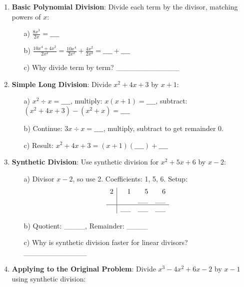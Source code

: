 \documentclass[12pt]{article}
\begin{document}
\begin{enumerate}[label=9.\arabic*]
    \item \textbf{Basic Polynomial Division}: Divide each term by the divisor, matching powers of \( x \):
    \begin{enumerate}
        \item[a)] \( \frac{8x^3}{2x} = \_\_\_\_ \)
        \item[b)] \( \frac{10x^4 + 4x^2}{2x^2} = \frac{10x^4}{2x^2} + \frac{4x^2}{2x^2} = \_\_\_\_ + \_\_\_\_ \)
        \item[c)] Why divide term by term? \_\_\_\_\_\_\_\_\_\_\_\_
    \end{enumerate}
    \item \textbf{Simple Long Division}: Divide \( x^2 + 4x + 3 \) by \( x + 1 \):
    \begin{enumerate}
        \item[a)] \( x^2 \div x = \_\_\_\_ \), multiply: \( x(x + 1) = \_\_\_\_ \), subtract: \( (x^2 + 4x + 3) - (x^2 + x) = \_\_\_\_ \)
        \item[b)] Continue: \( 3x \div x = \_\_\_\_ \), multiply, subtract to get remainder 0.
        \item[c)] Result: \( x^2 + 4x + 3 = (x + 1)(\_\_\_\_) + \_\_\_\_ \)
    \end{enumerate}
    \item \textbf{Synthetic Division}: Use synthetic division for \( x^2 + 5x + 6 \) by \( x - 2 \):
    \begin{enumerate}
        \item[a)] Divisor \( x - 2 \), so use 2. Coefficients: 1, 5, 6. Setup: \\
        \[
        \begin{array}{r|rrrr}
        2 & 1 & 5 & 6 \\
          &   & \_\_ & \_\_ \\
        \hline
          & \_\_ & \_\_ & \_\_ \\
        \end{array}
        \]
        \item[b)] Quotient: \_\_\_\_, Remainder: \_\_\_\_
        \item[c)] Why is synthetic division faster for linear divisors? \_\_\_\_\_\_\_\_\_\_\_\_
    \end{enumerate}
    \item \textbf{Applying to the Original Problem}: Divide \( x^3 - 4x^2 + 6x - 2 \) by \( x - 1 \) using synthetic division:
    \begin{enumerate}

\end{enumerate}
\end{enumerate}
\end{document}
